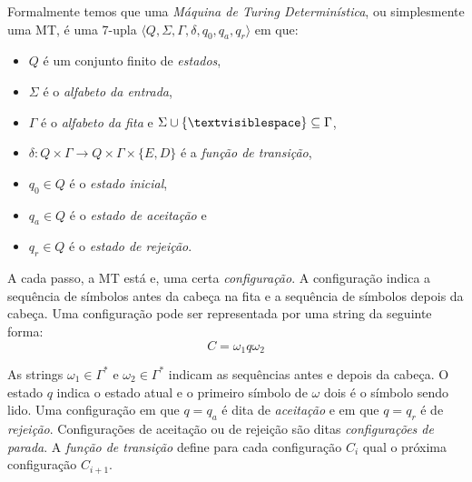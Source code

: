 Formalmente temos que uma {\em Máquina de Turing Determinística}, ou simplesmente uma MT, é uma 7-upla $\langle Q, \Sigma, \Gamma, \delta, q_0, q_a, q_r \rangle$ em que:
\begin{itemize}
\item[] $Q$ é um conjunto finito de {\em estados},
\item[] $\Sigma$ é o {\em alfabeto da entrada},
\item[] $\Gamma$ é o {\em alfabeto da fita} e $\Sigma \cup \{\textvisiblespace\} \subseteq \Gamma$,
\item[] $\delta: Q \times \Gamma \to Q \times \Gamma \times \{E, D\}$ é a {\em função de transição},
\item[] $q_0 \in Q$ é o {\em estado inicial},
\item[] $q_a \in Q$ é o {\em estado de aceitação} e
\item[] $q_r \in Q$ é o {\em estado de rejeição}.  
\end{itemize}

A cada passo, a MT está e, uma certa {\em configuração}.
A configuração indica a sequência de símbolos antes da cabeça na fita e a sequência de símbolos depois da cabeça.
Uma configuração pode ser representada por uma string da seguinte forma:
\begin{displaymath}
  C = \omega_1 q \omega_2
\end{displaymath}

As strings $\omega_1 \in \Gamma^*$ e $\omega_2 \in \Gamma^*$ indicam as sequências antes e depois da cabeça.
O estado $q$ indica o estado atual e o primeiro símbolo de $\omega$ dois é o símbolo sendo lido.
Uma configuração em que $q = q_a$ é dita de {\em aceitação} e em que $q = q_r$ é de {\em rejeição}.
Configurações de aceitação ou de rejeição são ditas {\em configurações de parada}.
A {\em função de transição} define para cada configuração $C_i$ qual o próxima configuração $C_{i+1}$.


